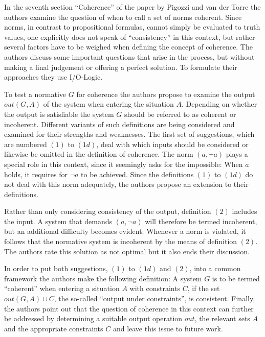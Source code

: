\documentclass[12pt]{article}
\begin{document}
\maketitle

In the seventh section \enquote{Coherence} of the paper by Pigozzi and van der Torre \cite{pigozzi2017multiagent} the authors examine the question of when to call a set of norms coherent. Since norms, in contrast to propositional formulas, cannot  simply be evaluated to truth values, one explicitly does not speak of \enquote{consistency} in this context, but rather several factors have to be weighed when defining the concept of coherence. The authors discuss some important questions that arise in the process, but without making a final judgement or offering a perfect solution. To formulate their approaches they use I/O-Logic.

To test a normative $G$ for coherence the authors propose to examine the output $\mathit{out}(G,A)$ of the system when entering the situation $A$. Depending on whether the output is satisfiable the system $G$ should be referred to as coherent or incoherent. Different variants of such definitions are being considered and examined for their strengths and weaknesses. The first set of suggestions, which are numbered $(1)$ to $(1d)$, deal with which inputs should be considered or likewise be omitted in the definition of coherence. The norm $(a, \neg a)$ plays a special role in this context, since it seemingly asks for the impossible: When $a$ holds, it requires for $\neg a$ to be achieved. Since the definitions $(1)$ to $(1d)$ do not deal with this norm adequately, the authors propose an extension to their definitions.

Rather than only considering consistency of the output, definition $(2)$ includes the input. A system that demands $(a, \neg a)$ will therefore be termed incoherent, but an additional difficulty becomes evident: Whenever a norm is violated, it follows that the normative system is incoherent by the means of definition $(2)$. The authors rate this solution as not optimal but it also ends their discussion.

In order to put both suggestions, $(1)$ to $(1d)$ and $(2)$, into a common framework the authors make the following definition: A system $G$ is to be termed \enquote{coherent} when entering a situation $A$ with constraints $C$, if the set $\mathit{out}(G,A) \cup C$, the so-called \enquote{output under constraints}, is consistent. Finally, the authors point out that the question of coherence in this context can further be addressed by determining a suitable output operation $\mathit{out}$, the relevant sets $A$ and the appropriate constraints $C$ and leave this issue to future work.
\end{document}
